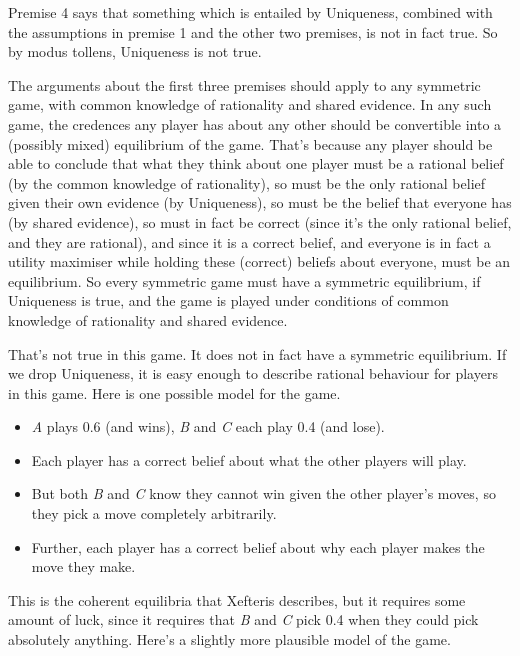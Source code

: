 \documentclass[
  12pt,
  letterpaper,
  DIV=11,
  numbers=noendperiod]{scrreprt}
\providecommand{\tightlist}{%
  \setlength{\itemsep}{0pt}\setlength{\parskip}{0pt}}\usepackage{longtable,booktabs,array}
\begin{document}
Premise 4 says that something which is entailed by Uniqueness, combined
with the assumptions in premise 1 and the other two premises, is not in
fact true. So by modus tollens, Uniqueness is not true.

The arguments about the first three premises should apply to any
symmetric game, with common knowledge of rationality and shared
evidence. In any such game, the credences any player has about any other
should be convertible into a (possibly mixed) equilibrium of the game.
That's because any player should be able to conclude that what they
think about one player must be a rational belief (by the common
knowledge of rationality), so must be the only rational belief given
their own evidence (by Uniqueness), so must be the belief that everyone
has (by shared evidence), so must in fact be correct (since it's the
only rational belief, and they are rational), and since it is a correct
belief, and everyone is in fact a utility maximiser while holding these
(correct) beliefs about everyone, must be an equilibrium. So every
symmetric game must have a symmetric equilibrium, if Uniqueness is true,
and the game is played under conditions of common knowledge of
rationality and shared evidence.

That's not true in this game. It does not in fact have a symmetric
equilibrium. If we drop Uniqueness, it is easy enough to describe
rational behaviour for players in this game. Here is one possible model
for the game.

\begin{itemize}
\tightlist
\item
  \emph{A} plays 0.6 (and wins), \emph{B} and \emph{C} each play 0.4
  (and lose).
\item
  Each player has a correct belief about what the other players will
  play.
\item
  But both \emph{B} and \emph{C} know they cannot win given the other
  player's moves, so they pick a move completely arbitrarily.
\item
  Further, each player has a correct belief about why each player makes
  the move they make.
\end{itemize}

This is the coherent equilibria that Xefteris describes, but it requires
some amount of luck, since it requires that \emph{B} and \emph{C} pick
0.4 when they could pick absolutely anything. Here's a slightly more
plausible model of the game.
\end{document}
